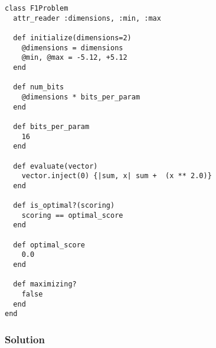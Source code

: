 \begin{lstlisting}[name=ga-problem, caption={F1 Problem}, label=ga-problem] 
class F1Problem
  attr_reader :dimensions, :min, :max
  
  def initialize(dimensions=2)
    @dimensions = dimensions
    @min, @max = -5.12, +5.12
  end
  
  def num_bits
    @dimensions * bits_per_param
  end
  
  def bits_per_param
    16
  end
  
  def evaluate(vector)
    vector.inject(0) {|sum, x| sum +  (x ** 2.0)}
  end  
  
  def is_optimal?(scoring)
    scoring == optimal_score
  end
  
  def optimal_score
    0.0
  end
  
  def maximizing?
    false
  end
end
\end{lstlisting}

\subsubsection{Solution}


